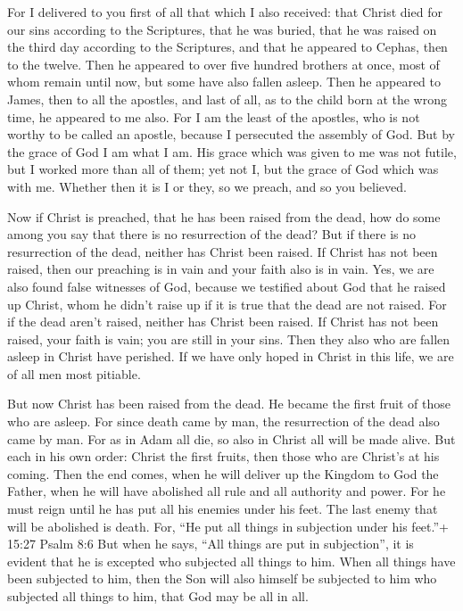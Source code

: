  For I delivered to you first of all that which I also
received: that Christ died for our sins according to the Scriptures,
 that he was buried, that he was raised on the third day
according to the Scriptures,  and that he appeared to
Cephas, then to the twelve.  Then he appeared to over five
hundred brothers at once, most of whom remain until now, but some have
also fallen asleep.  Then he appeared to James, then to all
the apostles,  and last of all, as to the child born at the
wrong time, he appeared to me also.  For I am the least of
the apostles, who is not worthy to be called an apostle, because I
persecuted the assembly of God.  But by the grace of God I
am what I am. His grace which was given to me was not futile, but I
worked more than all of them; yet not I, but the grace of God which was
with me.  Whether then it is I or they, so we preach, and
so you believed.

 Now if Christ is preached, that he has been raised from
the dead, how do some among you say that there is no resurrection of the
dead?  But if there is no resurrection of the dead, neither
has Christ been raised.  If Christ has not been raised,
then our preaching is in vain and your faith also is in vain.
 Yes, we are also found false witnesses of God, because we
testified about God that he raised up Christ, whom he didn't raise up if
it is true that the dead are not raised.  For if the dead
aren't raised, neither has Christ been raised.  If Christ
has not been raised, your faith is vain; you are still in your sins.
 Then they also who are fallen asleep in Christ have
perished.  If we have only hoped in Christ in this life, we
are of all men most pitiable.

 But now Christ has been raised from the dead. He became
the first fruit of those who are asleep.  For since death
came by man, the resurrection of the dead also came by man.
 For as in Adam all die, so also in Christ all will be made
alive.  But each in his own order: Christ the first fruits,
then those who are Christ's at his coming.  Then the end
comes, when he will deliver up the Kingdom to God the Father, when he
will have abolished all rule and all authority and power. 
For he must reign until he has put all his enemies under his feet.
 The last enemy that will be abolished is death.
 For, ``He put all things in subjection under his feet.''+
15:27 Psalm 8:6 But when he says, ``All things are put in subjection'',
it is evident that he is excepted who subjected all things to him.
 When all things have been subjected to him, then the Son
will also himself be subjected to him who subjected all things to him,
that God may be all in all.

